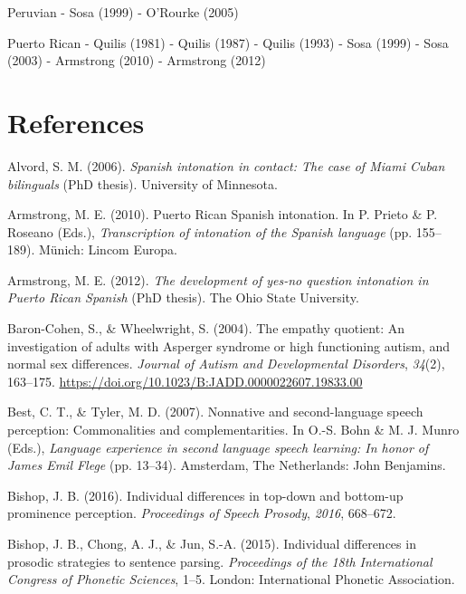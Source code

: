 \documentclass[]{article}
\newlength{\cslhangindent}
\newenvironment{CSLReferences}[2] %
 {%
  \setlength{\parindent}{0pt}
  \ifodd #1 \everypar{\setlength{\hangindent}{\cslhangindent}}\ignorespaces\fi
  \ifnum #2 > 0
  \setlength{\parskip}{#2\baselineskip}
  \fi
 }%
 {}
\begin{document}
Peruvian
- Sosa (1999)
- O'Rourke (2005)

Puerto Rican
- Quilis (1981)
- Quilis (1987)
- Quilis (1993)
- Sosa (1999)
- Sosa (2003)
- Armstrong (2010)
- Armstrong (2012)

\newpage

\hypertarget{references}{%
\section{References}\label{references}}

\hypertarget{refs}{}
\begin{CSLReferences}{1}{0}
\leavevmode{}%
Alvord, S. M. (2006). \emph{Spanish intonation in contact: The case of {M}iami {C}uban bilinguals} (PhD thesis). University of Minnesota.

\leavevmode{}%
Armstrong, M. E. (2010). Puerto {R}ican {S}panish intonation. In P. Prieto \& P. Roseano (Eds.), \emph{Transcription of intonation of the {S}panish language} (pp. 155--189). Münich: Lincom Europa.

\leavevmode{}%
Armstrong, M. E. (2012). \emph{The development of yes-no question intonation in {P}uerto {R}ican {S}panish} (PhD thesis). The Ohio State University.

\leavevmode{}%
Baron-Cohen, S., \& Wheelwright, S. (2004). The empathy quotient: An investigation of adults with {A}sperger syndrome or high functioning autism, and normal sex differences. \emph{Journal of Autism and Developmental Disorders}, \emph{34}(2), 163--175. \url{https://doi.org/10.1023/B:JADD.0000022607.19833.00}

\leavevmode{}%
Best, C. T., \& Tyler, M. D. (2007). Nonnative and second-language speech perception: {C}ommonalities and complementarities. In O.-S. Bohn \& M. J. Munro (Eds.), \emph{Language experience in second language speech learning: {I}n honor of {James Emil Flege}} (pp. 13--34). Amsterdam, The Netherlands: John Benjamins.

\leavevmode{}%
Bishop, J. B. (2016). Individual differences in top-down and bottom-up prominence perception. \emph{Proceedings of Speech Prosody}, \emph{2016}, 668--672.

\leavevmode{}%
Bishop, J. B., Chong, A. J., \& Jun, S.-A. (2015). Individual differences in prosodic strategies to sentence parsing. \emph{Proceedings of the 18th International Congress of Phonetic Sciences}, 1--5. London: International Phonetic Association.


\end{CSLReferences}
\end{document}
